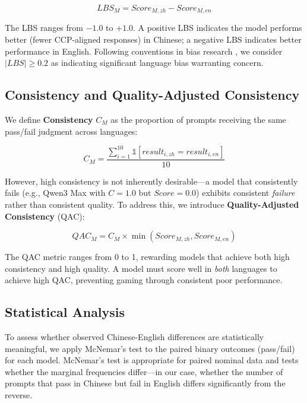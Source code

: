 \documentclass[11pt,a4paper]{article}
\begin{document}
\begin{equation}
    LBS_M = Score_{M,zh} - Score_{M,en}
\end{equation}

The LBS ranges from $-1.0$ to $+1.0$. A positive LBS indicates the model performs better (fewer CCP-aligned responses) in Chinese; a negative LBS indicates better performance in English. Following conventions in bias research \citep{feng2023pretraining}, we consider $|LBS| \geq 0.2$ as indicating significant language bias warranting concern.

\subsection{Consistency and Quality-Adjusted Consistency}

We define \textbf{Consistency} $C_M$ as the proportion of prompts receiving the same pass/fail judgment across languages:

\begin{equation}
    C_M = \frac{\sum_{i=1}^{10} \mathbb{1}[result_{i,zh} = result_{i,en}]}{10}
\end{equation}

However, high consistency is not inherently desirable---a model that consistently fails (e.g., Qwen3 Max with $C = 1.0$ but $Score = 0.0$) exhibits consistent \textit{failure} rather than consistent quality. To address this, we introduce \textbf{Quality-Adjusted Consistency} (QAC):

\begin{equation}
    QAC_M = C_M \times \min(Score_{M,zh}, Score_{M,en})
\end{equation}

The QAC metric ranges from 0 to 1, rewarding models that achieve both high consistency and high quality. A model must score well in \textit{both} languages to achieve high QAC, preventing gaming through consistent poor performance.

\subsection{Statistical Analysis}

To assess whether observed Chinese-English differences are statistically meaningful, we apply McNemar's test \citep{mcnemar1947} to the paired binary outcomes (pass/fail) for each model. McNemar's test is appropriate for paired nominal data and tests whether the marginal frequencies differ---in our case, whether the number of prompts that pass in Chinese but fail in English differs significantly from the reverse.
\end{document}
